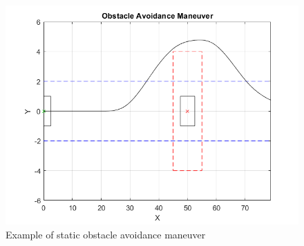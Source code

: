 \begin{figure}[H]
    \centering
    \includegraphics[width=1\textwidth]{Figures/static_avoidance_example.png}
    \caption{Example of static obstacle avoidance maneuver}
      \label{fig:static_avoidance_example}
\end{figure} 
